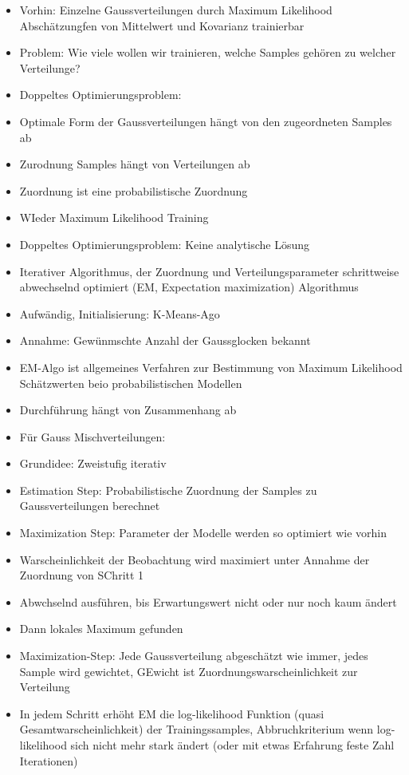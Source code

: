 \documentclass[a4paper,10pt,oneside]{article}
\begin{document}
\begin{itemize}
	\item Vorhin: Einzelne Gaussverteilungen durch Maximum Likelihood Abschätzungfen von Mittelwert und Kovarianz trainierbar
	\item Problem: Wie viele wollen wir trainieren, welche Samples gehören zu welcher Verteilunge?
	\item Doppeltes Optimierungsproblem:
	\item Optimale Form der Gaussverteilungen hängt von den zugeordneten Samples ab
	\item Zurodnung Samples hängt von Verteilungen ab
	\item Zuordnung ist eine probabilistische Zuordnung
	\item WIeder Maximum Likelihood Training
	\item Doppeltes Optimierungsproblem: Keine analytische Lösung
	\item Iterativer Algorithmus, der Zuordnung und Verteilungsparameter schrittweise abwechselnd optimiert (EM, Expectation maximization) Algorithmus
	\item Aufwändig, Initialisierung: K-Means-Ago
	\item Annahme: Gewünmschte Anzahl der Gaussglocken bekannt
	\item EM-Algo ist allgemeines Verfahren zur Bestimmung von Maximum Likelihood Schätzwerten beio probabilistischen Modellen
	\item Durchführung hängt von Zusammenhang ab
	\item Für Gauss Mischverteilungen:
	\item Grundidee: Zweistufig iterativ
	\item Estimation Step: Probabilistische Zuordnung der Samples zu Gaussverteilungen berechnet
	\item Maximization Step: Parameter der Modelle werden so optimiert wie vorhin
	\item Warscheinlichkeit der Beobachtung wird maximiert unter Annahme der Zuordnung von SChritt 1
	\item Abwchselnd ausführen, bis Erwartungswert nicht oder nur noch kaum ändert
	\item Dann lokales Maximum gefunden
	\item Maximization-Step: Jede Gaussverteilung abgeschätzt wie immer, jedes Sample wird gewichtet, GEwicht ist Zuordnungswarscheinlichkeit zur Verteilung
	\item In jedem Schritt erhöht EM die log-likelihood Funktion (quasi Gesamtwarscheinlichkeit) der Trainingssamples, Abbruchkriterium wenn log-likelihood sich nicht mehr stark ändert (oder mit etwas Erfahrung feste Zahl Iterationen)
\end{itemize}
\end{document}
